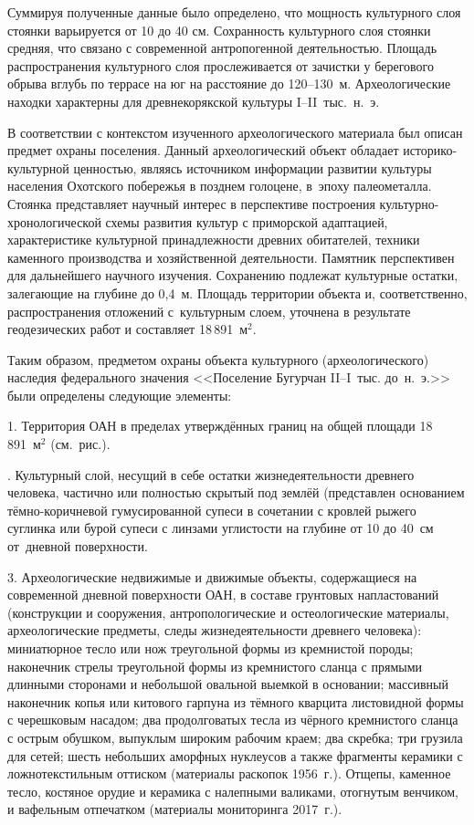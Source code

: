 Суммируя полученные данные было определено, что мощность культурного слоя стоянки варьируется от 10 до 40 см. Сохранность культурного слоя стоянки средняя, что связано с современной антропогенной деятельностью. Площадь распространения культурного слоя прослеживается от зачистки у берегового обрыва вглубь по террасе на юг на расстояние до 120--130~м. Археологические находки характерны для древнекорякской культуры I--II~тыс.~н.~э.

В соответствии с контекстом изученного археологического материала был описан предмет охраны поселения. Данный археологический объект обладает историко-культурной ценностью, являясь источником информации развитии культуры населения Охотского побережья в позднем голоцене, в~эпоху палеометалла. Стоянка представляет научный интерес в перспективе построения культурно-хронологической схемы развития культур с приморской адаптацией, характеристике культурной принадлежности древних обитателей, техники каменного производства и хозяйственной деятельности. Памятник перспективен для дальнейшего научного изучения. Сохранению подлежат культурные остатки, залегающие на глубине до 0,4~м. Площадь территории объекта и, соответственно, распространения отложений с~культурным слоем, уточнена в результате геодезических работ и составляет 18\,891~м$^2$.

Таким образом, предметом охраны объекта культурного (археологического) наследия федерального значения <<Поселение Бугурчан II--I~тыс. до~н.~э.>> были определены следующие элементы:

1. Территория ОАН в пределах утверждённых границ на общей площади  18\,891~м$^2$ (см.~рис.).


. Культурный слой, несущий в себе остатки жизнедеятельности древнего человека, частично или полностью скрытый под землёй (представлен основанием тёмно-коричневой гумусированной супеси в сочетании с кровлей рыжего суглинка или бурой супеси с линзами углистости на глубине от 10 до 40~см от~дневной поверхности.

3. Археологические недвижимые и движимые объекты, содержащиеся на современной дневной поверхности ОАН, в составе грунтовых напластований (конструкции и сооружения, антропологические и остеологические материалы, археологические предметы, следы жизнедеятельности древнего человека): миниатюрное тесло или нож треугольной формы из кремнистой породы; наконечник стрелы треугольной формы из кремнистого сланца с прямыми длинными сто­ронами и небольшой овальной выемкой в основании; массивный наконечник копья или китового гарпуна из тёмного кварцита листовидной формы с черешковым насадом; два продолговатых тесла из чёрного кремнистого сланца с острым обушком, выпуклым широким рабочим краем; два скребка; три грузила для сетей; шесть небольших аморфных нуклеусов а также фрагменты керамики с ложнотекстильным оттиском (материалы раскопок 1956~г.). Отщепы, каменное тесло, костяное орудие и керамика с налепными валиками, отогнутым венчиком, и вафельным отпечатком (материалы мониторинга 2017~г.).

